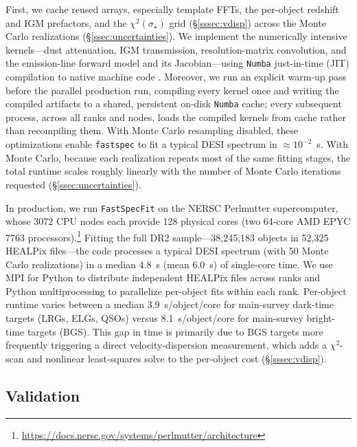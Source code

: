 \documentclass[modern,linenumbers]{aastex701}
\newcommand{\fastspecfit}{\texttt{FastSpecFit}}
\newcommand{\fastspec}{\texttt{fastspec}}
\newcommand{\vdisp}{\ensuremath{\sigma_\star}}
\begin{document}
First, we cache reused arrays, especially template FFTs, the
per-object redshift and IGM prefactors, and the $\chi^2(\vdisp)$ grid
(\S\ref{sssec:vdisp}) across the Monte Carlo realizations
(\S\ref{ssec:uncertainties}). We implement the numerically intensive
kernels---dust attenuation, IGM transmission, resolution-matrix
convolution, and the emission-line forward model and its
Jacobian---using \texttt{Numba} just-in-time (JIT) compilation to
native machine code \citep{lam15a}. Moreover, we run an explicit
warm-up pass before the parallel production run, compiling every
kernel once and writing the compiled artifacts to a shared, persistent
on-disk \texttt{Numba} cache; every subsequent process, across all
ranks and nodes, loads the compiled kernels from cache rather than
recompiling them. With Monte Carlo resampling disabled, these
optimizations enable \fastspec{} to fit a typical DESI spectrum in
$\approx10^{-2}$~s. With Monte Carlo, because each realization repeats
most of the same fitting stages, the total runtime scales roughly
linearly with the number of Monte Carlo iterations requested
(\S\ref{ssec:uncertainties}).

In production, we run \fastspecfit{} on the NERSC Perlmutter
supercomputer, whose 3072 CPU nodes each provide 128 physical cores
(two 64-core AMD EPYC 7763
processors).\footnote{\url{https://docs.nersc.gov/systems/perlmutter/architecture}}
Fitting the full DR2 sample---38,245,183 objects in 52,325 HEALPix
files---the code processes a typical DESI spectrum (with 50 Monte
Carlo realizations) in a median 4.8~s (mean 6.0~s) of single-core
time. We use MPI for Python \citep[\texttt{mpi4py};][]{dalcin21a} to
distribute independent HEALPix files across ranks and Python
multiprocessing to parallelize per-object fits within each rank.
Per-object runtime varies between a median 3.9~s/object/core for
main-survey dark-time targets (LRGs, ELGs, QSOs) versus
8.1~s/object/core for main-survey bright-time targets (BGS). This gap
in time is primarily due to BGS targets more frequently triggering a
direct velocity-dispersion measurement, which adds a $\chi^2$-scan and
nonlinear least-squares solve to the per-object cost
(\S\ref{sssec:vdisp}).


\subsection{Validation}
\label{ssec:validation}
\end{document}
